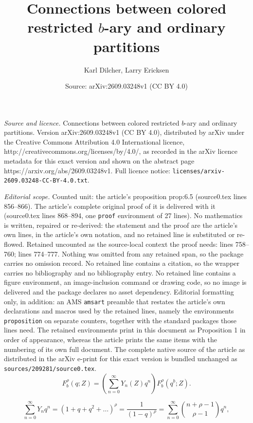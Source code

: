 \documentclass[10pt,a4paper]{amsart}
\title{Connections between colored restricted $b$-ary and ordinary partitions}
\author{Karl Dilcher, Larry Ericksen}
\date{Source: arXiv:2609.03248v1 (CC BY 4.0)}
\begin{document}
\maketitle

\noindent\emph{Source and licence.} Connections between colored restricted $b$-ary and ordinary partitions. Version arXiv:2609.03248v1 (CC BY 4.0), distributed by arXiv under the Creative Commons Attribution 4.0 International licence, http://creativecommons.org/licenses/by/4.0/, as recorded in the arXiv licence metadata for this exact version and shown on the abstract page https://arxiv.org/abs/2609.03248v1. Full licence notice: \texttt{licenses/arxiv-2609.03248-CC-BY-4.0.txt}.\par\smallskip

\noindent\textit{Editorial scope.} Counted unit: the article's proposition prop:6.5 (source0.tex lines 856--866). The article's complete original proof of it is delivered with it (source0.tex lines 868--894, one \texttt{proof} environment of 27 lines). No mathematics is written, repaired or re-derived: the statement and the proof are the article's own lines, in the article's own notation, and no retained line is substituted or re-flowed.  Retained uncounted as the source-local context the proof needs: lines 758--760; lines 774--777.  Nothing was omitted from any retained span, so the package carries no omission record.  No retained line contains a citation, so the wrapper carries no bibliography and no bibliography entry.  No retained line contains a figure environment, an image-inclusion command or drawing code, so no image is delivered and the package declares no asset dependency.  Editorial formatting only, in addition: an AMS \texttt{amsart} preamble that restates the article's own declarations and macros used by the retained lines, namely the environments \texttt{proposition} on separate counters, together with the standard packages those lines need.  The retained environments print in this document as Proposition 1 in order of appearance, whereas the article prints the same items with the numbering of its own full document.  The complete native source of the article as distributed in the arXiv e-print for this exact version is bundled unchanged as \texttt{sources/209281/source0.tex}.
\begin{equation}\label{5.9}
F_b^\rho(q;Z) =\left(\sum_{n=0}^\infty Y_n(Z)q^n\right)F_b^\rho(q^b;Z).
\end{equation}

\begin{equation}\label{6.1}
\sum_{n=0}^\infty Y_nq^n = \left(1+q+q^2+\dots\right)^\rho=\frac{1}{(1-q)^\rho}
=\sum_{n=0}^\infty\binom{n+\rho-1}{\rho-1}q^n,
\end{equation}
\end{document}
